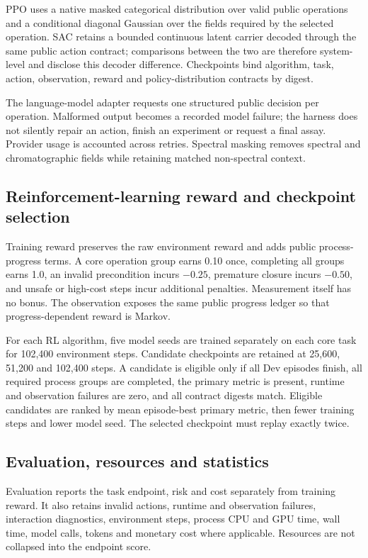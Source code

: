 \documentclass[11pt]{article}
\begin{document}
PPO uses a native masked categorical distribution over valid public operations and a conditional diagonal Gaussian over the fields required by the selected operation. SAC retains a bounded continuous latent carrier decoded through the same public action contract; comparisons between the two are therefore system-level and disclose this decoder difference. Checkpoints bind algorithm, task, action, observation, reward and policy-distribution contracts by digest.

The language-model adapter requests one structured public decision per operation. Malformed output becomes a recorded model failure; the harness does not silently repair an action, finish an experiment or request a final assay. Provider usage is accounted across retries. Spectral masking removes spectral and chromatographic fields while retaining matched non-spectral context.

\subsection*{Reinforcement-learning reward and checkpoint selection}

Training reward preserves the raw environment reward and adds public process-progress terms. A core operation group earns 0.10 once, completing all groups earns 1.0, an invalid precondition incurs $-0.25$, premature closure incurs $-0.50$, and unsafe or high-cost steps incur additional penalties. Measurement itself has no bonus. The observation exposes the same public progress ledger so that progress-dependent reward is Markov.

For each RL algorithm, five model seeds are trained separately on each core task for 102,400 environment steps. Candidate checkpoints are retained at 25,600, 51,200 and 102,400 steps. A candidate is eligible only if all Dev episodes finish, all required process groups are completed, the primary metric is present, runtime and observation failures are zero, and all contract digests match. Eligible candidates are ranked by mean episode-best primary metric, then fewer training steps and lower model seed. The selected checkpoint must replay exactly twice.

\subsection*{Evaluation, resources and statistics}

Evaluation reports the task endpoint, risk and cost separately from training reward. It also retains invalid actions, runtime and observation failures, interaction diagnostics, environment steps, process CPU and GPU time, wall time, model calls, tokens and monetary cost where applicable. Resources are not collapsed into the endpoint score.
\end{document}
